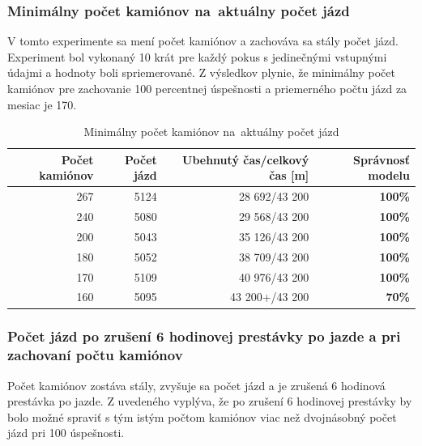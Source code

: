 \documentclass[a4paper, 11pt]{article}
\begin{document}
    \subsubsection{Minimálny počet kamiónov na~aktuálny počet jázd}
    V tomto  experimente sa mení počet kamiónov a zachováva sa stály počet
    jázd. Experiment bol vykonaný
    10 krát pre každý pokus s jedinečnými vstupnými údajmi a hodnoty boli spriemerované.\newline
    Z výsledkov plynie, že minimálny počet kamiónov pre zachovanie
    100 percentnej úspešnosti a priemerného počtu jázd za mesiac je 170.
    \begin{table}[ht]
		\centering
		\begin{tabular}{|r|r|r|r|}
			\hline
			Počet kamiónov & Počet jázd & Ubehnutý čas/celkový čas [m] & \textbf{Správnosť modelu} \\ \hline
			267 & 5124 & 28 692/43 200 &\textbf{100\%} \\ \hline
            240 & 5080 & 29 568/43 200 &\textbf{100\%} \\ \hline
            200 & 5043 & 35 126/43 200 &\textbf{100\%} \\ \hline
            180 & 5052 & 38 709/43 200 &\textbf{100\%} \\ \hline
            170 & 5109 & 40 976/43 200 &\textbf{100\%} \\ \hline
            160 & 5095 & 43 200+/43 200 &\textbf{70\%} \\ \hline  
		\end{tabular}

		\caption{Minimálny počet kamiónov na~aktuálny počet jázd}
		\label{table:3}
	\end{table}

    \subsubsection{Počet jázd po zrušení 6 hodinovej prestávky po jazde a pri zachovaní počtu kamiónov}
    Počet kamiónov zostáva stály, zvyšuje sa počet jázd a je zrušená 6 hodinová
    prestávka po jazde.\newline
    Z uvedeného vyplýva, že po zrušení 6 hodinovej prestávky by bolo možné
    spraviť s tým istým počtom kamiónov viac než dvojnásobný počet jázd
    pri 100 úspešnosti. 
    
\end{document}
